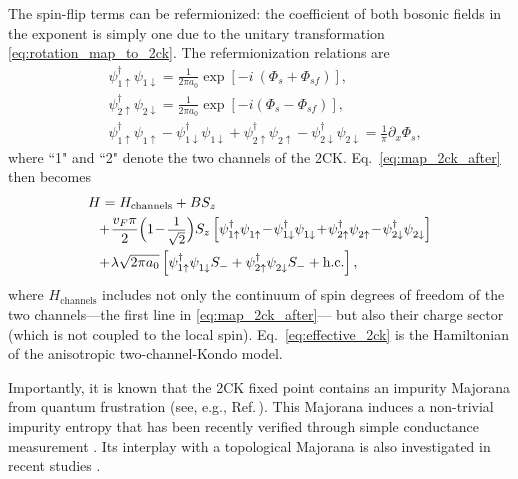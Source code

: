 \documentclass[aps,prb,reprint,floatfix,superscriptaddress,amssymb,amsmath]{revtex4-2}
\newcommand{\phdag}{{\phantom{\dagger}}}
\newcommand{\sdfrac}[2]{\mbox{\small$\displaystyle\frac{#1}{#2}$}}
\begin{document}
The spin-flip terms can be refermionized: the coefficient of both bosonic fields in the exponent is simply one due to the unitary transformation \eqref{eq:rotation_map_to_2ck}. The refermionization relations are \cite{GogolinBook,SchillerHershToulousePRB98}
\begin{equation}
\begin{aligned}
   & \psi^{\dagger}_{1\uparrow} \psi^\phdag_{1\downarrow} = \frac{1}{2\pi a_0} \exp[-i\ ( \Phi_s + \Phi_{sf} ) ],\\
   & \psi^{\dagger}_{2\uparrow} \psi^\phdag_{2\downarrow} = \frac{1}{2\pi a_0} \exp[-i ( \Phi_s - \Phi_{sf} ) ],\\
   & \psi^{\dagger}_{1\uparrow}\psi^\phdag_{1\uparrow} - \psi^{\dagger}_{1\downarrow}\psi^\phdag_{1\downarrow} + \psi^{\dagger}_{2\uparrow}\psi^\phdag_{2\uparrow} - \psi^{\dagger}_{2\downarrow}\psi^\phdag_{2\downarrow} = \frac{1}{\pi} \partial_x \Phi_s,
\end{aligned}
\end{equation}
where ``1" and ``2" denote the two channels of the 2CK. Eq.~\eqref{eq:map_2ck_after} then becomes
\begin{equation}
\begin{aligned}
H &= H_\text{channels} + BS_z \\
& \!\!+\! \frac{v_F  \pi}{2} \Big( 1 \!-\!\sdfrac{1}{\sqrt{2}}\Big)   S_z 
\left[\psi^{\dagger}_{1\uparrow}\psi^\phdag_{1\uparrow} 
\!-\! \psi^{\dagger}_{1\downarrow}\psi^\phdag_{1\downarrow} 
\!+\! \psi^{\dagger}_{2\uparrow}\psi^\phdag_{2\uparrow} 
\!-\! \psi^{\dagger}_{2\downarrow}\psi^\phdag_{2\downarrow} \right] \\
& \!\!+\!  \lambda\sqrt{2\pi a_0}  \left[ \psi^{\dagger}_{1\uparrow} \psi^\phdag_{1\downarrow} S_-   
+  \psi^{\dagger}_{2\uparrow} \psi^\phdag_{2\downarrow} S_-  + \text{h.c.}\right] ,
\end{aligned}
\label{eq:effective_2ck}
\end{equation}
where $H_\text{channels}$ includes not only the continuum of spin degrees of freedom of the two channels---the first line in \eqref{eq:map_2ck_after}--- but also their charge sector (which is not coupled to the local spin). 
Eq.~\eqref{eq:effective_2ck} is the Hamiltonian of the anisotropic two-channel-Kondo model. 

Importantly, it is known that the 2CK fixed point contains an impurity Majorana from quantum frustration (see, e.g., Ref.\,\cite{SchillerHershToulousePRB98}). This Majorana induces a non-trivial impurity entropy that has been recently verified through simple conductance measurement \cite{PierreMeirSelaX21}. Its interplay with a topological Majorana is also investigated in recent studies \cite{GuHaroldPRB20, GuChristianPRB20}.



\end{document}
